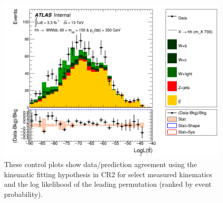 \begin{figure}[!hb]
\begin{center}
                \includegraphics[width=.47\textwidth]{figures/kinFit_appendix/bbpt350/C_mBBcr_opt2000_bbpt350_LogLikelihood_ttbar}
	\caption{These control plots show data/prediction agreement using the \ttbar kinematic fitting hypothesis in CR2 for select measured kinematics and the log likelihood of the leading permutation (ranked by event probability).}
	\label{fig:klfitter_control_plots_bbpt350}
	\end{center}    
	\end{figure}


